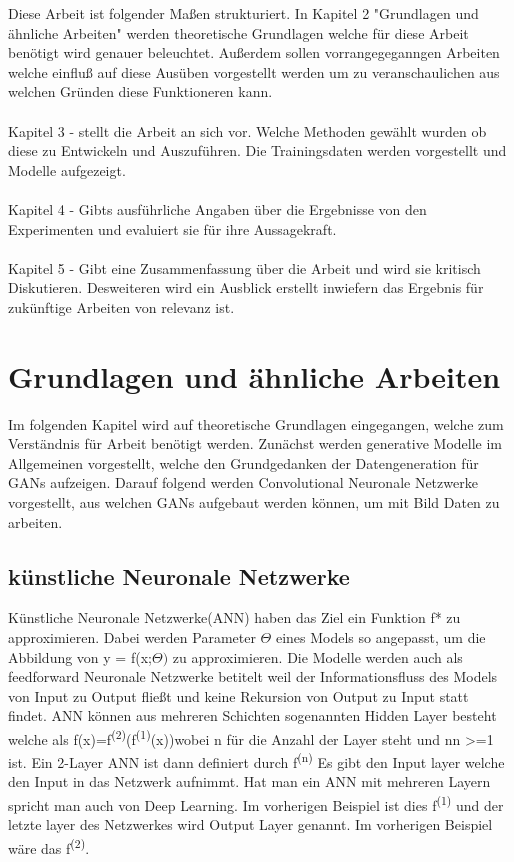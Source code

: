 \documentclass{llncs}
\begin{document}
Diese Arbeit ist folgender Maßen strukturiert. In Kapitel 2 "Grundlagen und ähnliche Arbeiten" werden theoretische Grundlagen welche für diese Arbeit benötigt wird genauer beleuchtet. Außerdem sollen vorrangegeganngen Arbeiten welche einfluß auf diese Ausüben vorgestellt werden um zu veranschaulichen aus welchen Gründen diese Funktioneren kann.
\\\\
Kapitel 3 - stellt die Arbeit an sich vor. Welche Methoden gewählt wurden ob diese zu Entwickeln und Auszuführen. Die Trainingsdaten werden vorgestellt und Modelle aufgezeigt.
\\\\
Kapitel 4 - Gibts  ausführliche Angaben über die Ergebnisse von den Experimenten und evaluiert sie für ihre Aussagekraft.
\\\\
Kapitel 5 - Gibt eine Zusammenfassung über die Arbeit und wird sie kritisch Diskutieren. Desweiteren wird ein Ausblick erstellt inwiefern das Ergebnis für zukünftige Arbeiten von relevanz ist. 

\section{Grundlagen und ähnliche Arbeiten}

Im folgenden Kapitel wird auf theoretische Grundlagen eingegangen, welche zum Verständnis für Arbeit benötigt werden. Zunächst werden  generative Modelle im Allgemeinen vorgestellt, welche den Grundgedanken der Datengeneration für GANs aufzeigen. Darauf folgend werden Convolutional Neuronale Netzwerke vorgestellt, aus welchen GANs aufgebaut werden können, um mit Bild Daten zu arbeiten.

\subsection{künstliche Neuronale Netzwerke}

Künstliche Neuronale Netzwerke(ANN) haben das Ziel ein Funktion f* zu approximieren. Dabei werden Parameter $\Theta$ eines Models so angepasst, um die Abbildung von y = f(x;$\Theta)$ zu approximieren. Die Modelle werden auch als feedforward Neuronale Netzwerke betitelt weil der Informationsfluss des Models von Input zu Output fließt und keine Rekursion von Output zu Input statt findet. ANN können aus mehreren Schichten sogenannten Hidden Layer besteht welche als f(x)=f\textsuperscript{(2)}(f\textsuperscript{(1)}(x))wobei n für die Anzahl der Layer steht und nn >=1 ist. Ein 2-Layer ANN ist dann definiert durch f\textsuperscript{(n)} Es gibt den Input layer welche den Input in das Netzwerk aufnimmt. Hat man ein ANN mit mehreren Layern spricht man auch von Deep Learning. Im vorherigen Beispiel ist dies f\textsuperscript{(1)} und der letzte layer des Netzwerkes wird Output Layer genannt. Im vorherigen Beispiel wäre das f\textsuperscript{(2)}\cite{Grundlagen}. 
\end{document}
